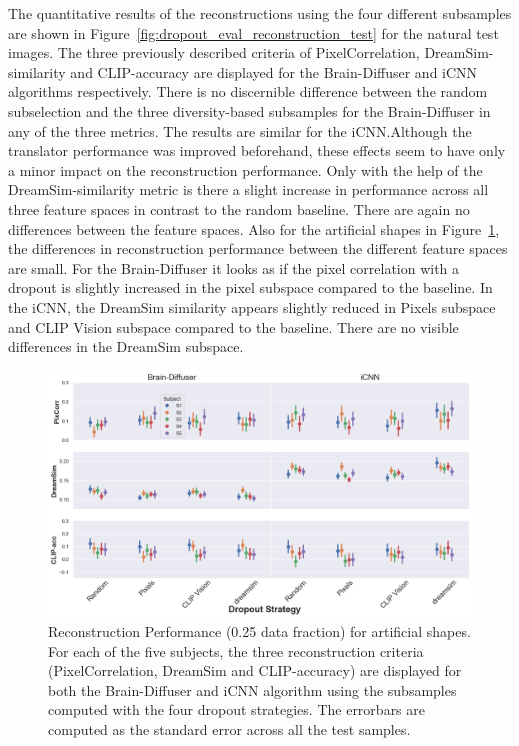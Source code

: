 The quantitative results of the reconstructions using the four different subsamples are shown in Figure~\ref{fig:dropout_eval_reconstruction_test} for the natural test images. The three previously described criteria of PixelCorrelation, DreamSim-similarity and CLIP-accuracy are displayed for the Brain-Diffuser and iCNN algorithms respectively. There is no discernible difference between the random subselection and the three diversity-based subsamples for the Brain-Diffuser in any of the three metrics. The results are similar for the iCNN.\@ Although the translator performance was improved beforehand, these effects seem to have only a minor impact on the reconstruction performance. Only with the help of the DreamSim-similarity metric is there a slight increase in performance across all three feature spaces in contrast to the random baseline. There are again no differences between the feature spaces. Also for the artificial shapes in Figure~\ref{fig:dropout_eval_reconstruction_art}, the differences in reconstruction performance between the different feature spaces are small. For the Brain-Diffuser it looks as if the pixel correlation with a dropout is slightly increased in the pixel subspace compared to the baseline.  In the iCNN, the DreamSim similarity appears slightly reduced in Pixels subspace and CLIP Vision subspace compared to the baseline. There are no visible differences in the DreamSim subspace.

\begin{figure}[ht]
  \centering
  \includegraphics[width=1\textwidth]{plots/dropout_eval_reconstruction_art.png}
  \caption[Experiment 1: Reconstruction performance for artificial shapes]{Reconstruction Performance (0.25 data fraction) for artificial shapes. For each of the five subjects, the three reconstruction criteria (PixelCorrelation, DreamSim and CLIP-accuracy) are displayed for both the Brain-Diffuser and iCNN algorithm using the subsamples computed with the four dropout strategies. The errorbars are computed as the standard error across all the test samples.}\label{fig:dropout_eval_reconstruction_art}
\end{figure}


